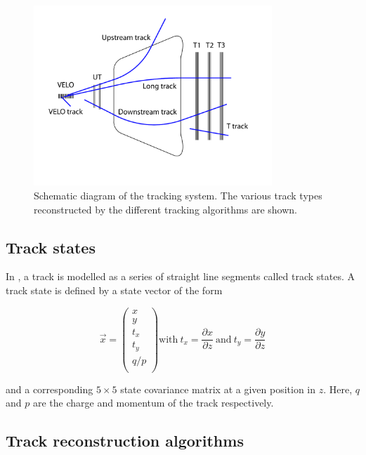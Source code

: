 \begin{figure}[!tb]
\centering
\includegraphics[width=0.8\textwidth]{figs/tracking/trackTypes.pdf}
\caption{Schematic diagram of the \lhcb tracking system. The various track types reconstructed by the different tracking algorithms are shown.}
\label{fig:track-types}
\end{figure}

\subsection{Track states}
\label{sec:track:track-states}

In \lhcb, a track is modelled as a series of straight line segments
called track states. A track state is defined by a state vector of the form

\begin{equation}
\vec x = 
\begin{pmatrix}
x \\
y \\
t_{x} \\
t_{y} \\
q/p \\
\end{pmatrix}
\text{with}~t_{x} = \frac{\partial x}{\partial z} ~\text{and}~ t_{y} = \frac{\partial y}{\partial z} 
\end{equation}

\noindent and a corresponding $5\times5$ state covariance matrix at a given position in $z$. Here, $q$ and $p$ are the charge and momentum of the track respectively.

\subsection{Track reconstruction algorithms}
\label{sec:track:algos}

